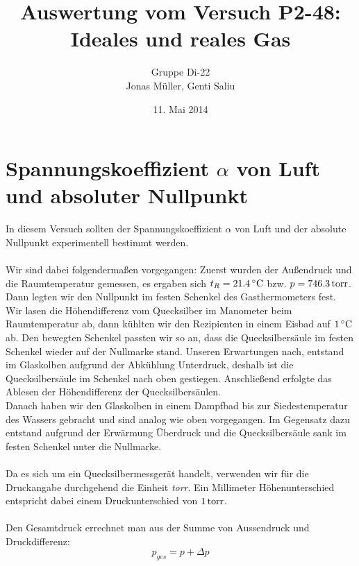 \documentclass[a4paper,titlepage]{scrartcl}
\title{Auswertung vom Versuch P2-48: Ideales und reales Gas}
\author{Gruppe Di-22\\Jonas Müller, Genti Saliu}
\date{11. Mai 2014}
\numberwithin{equation}{section}
\begin{document}
\begin{titlepage}
\maketitle
\thispagestyle{empty}
\end{titlepage}

\newpage
{}
\tableofcontents

\newpage
{}

\section{Spannungskoeffizient $\alpha$ von Luft und absoluter Nullpunkt}
In diesem Versuch sollten der Spannungskoeffizient $\alpha$ von Luft und der absolute Nullpunkt experimentell bestimmt werden.\\ \\
Wir sind dabei folgendermaßen vorgegangen: Zuerst wurden der Außendruck und die Raumtemperatur gemessen, es ergaben sich $t_R=\unit[21.4]{^{\circ}C}$ bzw. $p=\unit[746.3]{torr}$.\\
Dann legten wir den Nullpunkt im festen Schenkel des Gasthermometers fest. Wir lasen die Höhendifferenz vom Quecksilber im Manometer beim Raumtemperatur ab, dann kühlten wir den Rezipienten in einem Eisbad auf $\unit[1]{^{\circ} C}$ ab. Den bewegten Schenkel passten wir so an, dass die Quecksilbersäule im festen Schenkel wieder auf der Nullmarke stand. Unseren Erwartungen nach, entstand im Glaskolben aufgrund der Abkühlung Unterdruck, deshalb ist die Quecksilbersäule im Schenkel nach oben gestiegen. Anschließend erfolgte das Ablesen der Höhendifferenz der Quecksilbersäulen.\\
Danach haben wir den Glaskolben in einem Dampfbad bis zur Siedestemperatur des Wassers gebracht und sind analog wie oben vorgegangen. Im Gegensatz dazu entstand aufgrund der Erwärmung Überdruck und die Quecksilbersäule sank im festen Schenkel unter die Nullmarke.\\ \\
Da es sich um ein Quecksilbermessgerät handelt, verwenden wir für die Druckangabe durchgehend die Einheit \emph{torr}. Ein Millimeter Höhenunterschied entspricht dabei einem Druckunterschied von $\unit[1]{torr}$.\\ \\
Den Gesamtdruck errechnet man aus der Summe von Aussendruck und Druckdifferenz:
\begin{equation*}
p_{ges}=p + \Delta p
\end{equation*}
\end{document}
